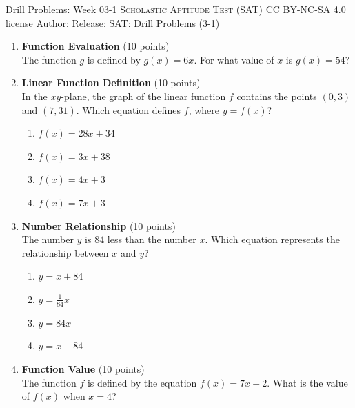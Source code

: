 \newpage\handout
{Drill Problems: Week 03-1}
{\textsc{Scholastic Aptitude Test (SAT)}}
{\href{https://creativecommons.org/licenses/by-nc-sa/4.0/}{CC BY-NC-SA 4.0 license}}
{Author: \BookAuthor}{Release: \generatedOn}
{SAT: Drill Problems (3-1)}


\begin{enumerate}
  \item \textbf{Function Evaluation} (10 points)\\
  The function $g$ is defined by $g(x)=6x$. For what value of $x$ is $g(x)=54$?
  \begin{subanswer}
  \end{subanswer}

  \item \textbf{Linear Function Definition} (10 points)\\
  In the $xy$-plane, the graph of the linear function $f$ contains the points $(0,3)$ and $(7,31)$. Which equation defines $f$, where $y=f(x)$?\\
  \begin{enumerate}[label=(\Alph*)]
    \item $f(x)=28x+34$
    \item $f(x)=3x+38$
    \item $f(x)=4x+3$
    \item $f(x)=7x+3$
  \end{enumerate}
  \begin{subanswer}
  \end{subanswer}

  \item \textbf{Number Relationship} (10 points)\\
  The number $y$ is 84 less than the number $x$. Which equation represents the relationship between $x$ and $y$?\\
  \begin{enumerate}[label=(\Alph*)]
    \item $y=x+84$
    \item $y=\frac{1}{84}x$
    \item $y=84x$
    \item $y=x-84$
  \end{enumerate}
  \begin{subanswer}
  \end{subanswer}

  \item \textbf{Function Value} (10 points)\\
  The function $f$ is defined by the equation $f(x)=7x+2$. What is the value of $f(x)$ when $x=4$?
  \begin{subanswer}
  \end{subanswer}




\end{enumerate}
